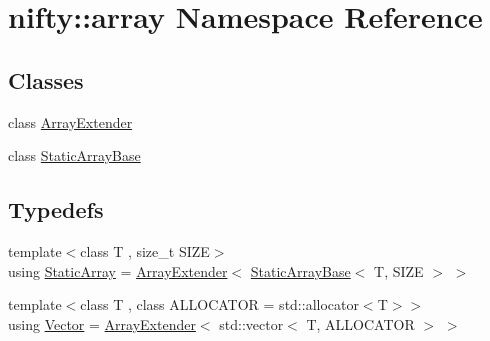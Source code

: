 \hypertarget{namespacenifty_1_1array}{}\section{nifty\+:\+:array Namespace Reference}
\label{namespacenifty_1_1array}
\subsection*{Classes}
\begin{DoxyCompactItemize}
\item 
class \hyperlink{classnifty_1_1array_1_1ArrayExtender}{Array\+Extender}
\item 
class \hyperlink{classnifty_1_1array_1_1StaticArrayBase}{Static\+Array\+Base}
\end{DoxyCompactItemize}
\subsection*{Typedefs}
\begin{DoxyCompactItemize}
\item 
{\footnotesize template$<$class T , size\+\_\+t S\+I\+ZE$>$ }\\using \hyperlink{namespacenifty_1_1array_a683f151f19c851754e0c6d55ed16a0c2}{Static\+Array} = \hyperlink{classnifty_1_1array_1_1ArrayExtender}{Array\+Extender}$<$ \hyperlink{classnifty_1_1array_1_1StaticArrayBase}{Static\+Array\+Base}$<$ T, S\+I\+ZE $>$ $>$
\item 
{\footnotesize template$<$class T , class A\+L\+L\+O\+C\+A\+T\+OR  = std\+::allocator$<$\+T$>$$>$ }\\using \hyperlink{namespacenifty_1_1array_aa0fe9e5e97322da484fa8ffd2fe44cd5}{Vector} = \hyperlink{classnifty_1_1array_1_1ArrayExtender}{Array\+Extender}$<$ std\+::vector$<$ T, A\+L\+L\+O\+C\+A\+T\+OR $>$ $>$
\end{DoxyCompactItemize}
